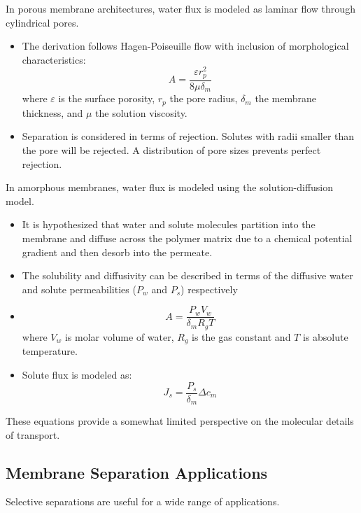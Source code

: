   In porous membrane architectures, water flux is modeled as laminar flow through 
  cylindrical pores.
  \begin{itemize}
    \item The derivation follows Hagen-Poiseuille flow with inclusion of morphological
    characteristics:
    \begin{equation}
    A = \frac{\varepsilon r_p^2}{8\mu\delta_m}
    \end{equation}
    where $\varepsilon$ is the surface porosity, $r_p$ the pore radius, $\delta_m$ the
    membrane thickness, and $\mu$ the solution viscosity.
    \item Separation is considered in terms of rejection. Solutes with radii smaller
    than the pore will be rejected. A distribution of pore sizes prevents perfect
    rejection.
  \end{itemize}
  
  In amorphous membranes, water flux is modeled using the solution-diffusion 
  model.
  \begin{itemize}
    \item It is hypothesized that water and solute molecules partition into the
    membrane and diffuse across the polymer matrix due to a chemical potential
    gradient and then desorb into the permeate.
    \item The solubility and diffusivity can be described  in terms of the 
    diffusive water and solute permeabilities ($P_w$ and $P_s$) respectively
    \item \begin{equation}
    A = \frac{P_wV_w}{\delta_mR_gT}
    \end{equation}
    where $V_w$ is molar volume of water, $R_g$ is the gas constant and $T$ is
    absolute temperature.
    \item Solute flux is modeled as:
    \begin{equation}
    J_s = \frac{P_s}{\delta_m}\Delta c_m
    \end{equation}
  \end{itemize}
  
  These equations provide a somewhat limited perspective on the molecular details
  of transport. 
  
  
  \subsection{Membrane Separation Applications}
  
  Selective separations are useful for a wide range of applications.  
  
